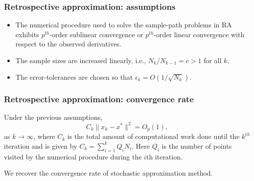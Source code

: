 \documentclass{beamer}
\begin{document}
\begin{frame}
\frametitle{Retrospective approximation: assumptions}

\begin{itemize}
\item
The numerical procedure used to solve the sample-path problems in RA exhibits $p^{th}$-order sublinear convergence or $p^{th}$-order linear convergence with respect to the observed derivatives.
\item
The sample sizes are increased linearly, i.e., $N_k / N_{k - 1} = c > 1$ for all $k$.
\item
The error-tolerances are chosen so that
$\epsilon_k= O(1/\sqrt{N_k})$.
\end{itemize}

\end{frame}

\begin{frame}
\frametitle{Retrospective approximation: convergence rate}

Under the previous assumptions, %
$$
C_k \| x_k - x^* \|^2 = O_p(1),
$$
as $k \rightarrow \infty$, where $C_k$ is the total amount of computational work done until the $k^{th}$ iteration and is given by $C_k = \sum^k_{i = 1} Q_iN_i$.
Here $Q_i$ is the number of points visited by the numerical procedure during the $i$th iteration.

\mbox{}

We recover the convergence rate of stochastic approximation method.

\end{frame}



\end{document}
